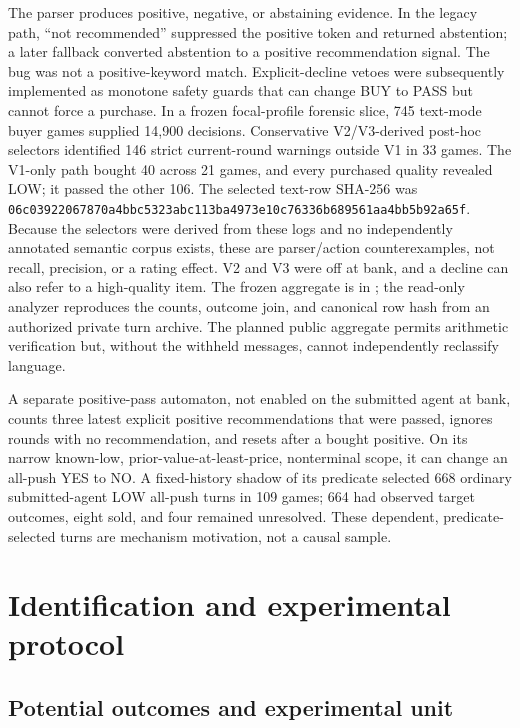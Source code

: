 The parser produces positive, negative, or abstaining evidence. In the legacy
path, ``not recommended'' suppressed the positive token and returned
abstention; a later fallback converted abstention to a positive recommendation
signal. The
bug was not a positive-keyword match. Explicit-decline vetoes were subsequently
implemented as monotone safety guards that can change BUY to PASS but cannot
force a purchase. In a frozen focal-profile forensic slice, 745 text-mode buyer
games supplied 14,900 decisions. Conservative V2/V3-derived post-hoc selectors
identified 146 strict current-round warnings outside V1 in 33 games. The
V1-only path bought 40 across 21 games, and every purchased quality revealed
LOW; it passed the other 106. The selected text-row SHA-256 was
\texttt{06c03922067870a4bbc5323abc113ba4973e10c76336b689561aa4bb5b92a65f}.
Because the selectors were derived from these logs and no independently
annotated semantic corpus exists, these are parser/action counterexamples, not
recall, precision, or a rating effect. V2 and V3 were off at bank, and a
decline can also refer to a high-quality item.
The frozen aggregate is in
; the read-only analyzer
 reproduces the
counts, outcome join, and canonical row hash from an authorized private turn
archive. The planned public aggregate permits arithmetic verification but,
without the withheld messages, cannot independently reclassify language.

A separate positive-pass automaton, not enabled on the submitted agent at bank, counts three
latest explicit positive recommendations that were passed, ignores rounds with
no recommendation, and resets after a bought positive. On its narrow known-low,
prior-value-at-least-price, nonterminal scope, it can change an all-push YES to
NO. A fixed-history shadow of its predicate selected 668 ordinary submitted-agent LOW
all-push turns in 109 games; 664 had observed target outcomes, eight sold, and
four remained unresolved. These dependent, predicate-selected turns are
mechanism motivation, not a causal sample.

\section{Identification and experimental protocol}
\label{app:identification}
\label{app:experiments}

\subsection{Potential outcomes and experimental unit}

